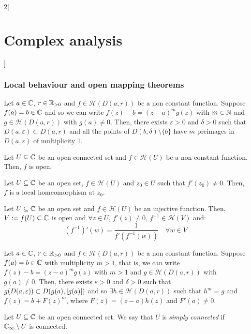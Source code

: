 \documentclass[../../../main_math.tex]{subfiles}
\begin{document}
\begin{multicols}{2}[\section{Complex analysis}]
  \subsubsection{Local behaviour and open mapping theorems}
  \begin{theorem}
    Let $a\in\mathbb{C}$, $r\in\mathbb{R}_{>0}$ and $f\in\mathcal{H}(D(a,r))$ be a non constant function. Suppose $f(a)=b\in \mathbb{C}$ and so we can write $f(z)-b={(z-a)}^mg(z)$ with $m\in\mathbb{N}$ and $g\in\mathcal{H}(D(a,r))$ with $g(a)\ne 0$. Then, there exists $\varepsilon>0$ and $\delta>0$ such that $D(a,\varepsilon)\subset D(a,r)$ and all the points of $D(b,\delta)\setminus\{b\}$ have $m$ preimages in $D(a,\varepsilon)$ of multiplicity 1.
  \end{theorem}
  \begin{theorem}
    Let $U\subseteq\mathbb{C}$ be an open connected set and $f\in\mathcal{H}(U)$ be a non-constant function. Then, $f$ is open.
  \end{theorem}
  \begin{corollary}
    Let $U\subseteq\mathbb{C}$ be an open set, $f\in\mathcal{H}(U)$ and $z_0\in U$ such that $f'(z_0)\ne 0$. Then, $f$ is a local homeomorphism at $z_0$.
  \end{corollary}
  \begin{corollary}
    Let $U\subseteq\mathbb{C}$ be an open set and $f\in\mathcal{H}(U)$ be an injective function. Then, $V:=f(U)\subseteq \mathbb{C}$ is open and $\forall z\in U$, $f'(z)\ne 0$, $f^{-1}\in \mathcal{H}(V)$ and: $${(f^{-1})}'(w)=\frac{1}{f'(f^{-1}(w))}\quad\forall w\in V$$
  \end{corollary}
  \begin{theorem}
    Let $a\in\mathbb{C}$, $r\in\mathbb{R}_{>0}$ and $f\in\mathcal{H}(D(a,r))$ be a non constant function. Suppose $f(a)=b\in \mathbb{C}$ with multiplicity $m>1$, that is, we can write $f(z)-b={(z-a)}^mg(z)$ with $m>1$ and $g\in\mathcal{H}(D(a,r))$ with $g(a)\ne 0$. Then, there exists $\varepsilon>0$ and $\delta>0$ such that $g(D(a,\varepsilon))\subset D(g(a),\abs{g(a)})$ and so $\exists h\in \mathcal{H}(D(a,r))$ such that $h^m=g$ and $f(z)=b+{F(z)}^m$, where $F(z)=(z-a)h(z)$ and $F'(a)\ne 0$.
  \end{theorem}
  \begin{definition}
    Let $U\subseteq\mathbb{C}$ be an open connected set. We say that $U$ is \emph{simply connected} if $\mathbb{C}_\infty\setminus U$ is connected.
  \end{definition}
  \begin{proposition}

\end{proposition}
\end{multicols}
\end{document}
